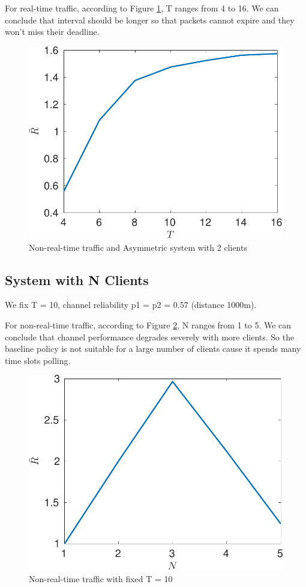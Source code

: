 \documentclass{article}
\begin{document}
For real-time traffic, according to Figure \ref{realtime_throughput_T}, T ranges from 4 to 16. We can conclude that interval should be longer so that packets cannot expire and they won't miss their deadline. 

\begin{figure}[htbp]
\centering
\includegraphics[scale=0.7]{realtime_throughput_T.pdf}
\caption{Non-real-time traffic and Asymmetric system with 2 clients}
\label{realtime_throughput_T}
\end{figure}

\subsection{System with N Clients}
We fix T = 10, channel reliability p1 = p2 = 0.57 (distance 1000m).

For non-real-time traffic, according to Figure \ref{nonrealtime_throughput_N}, N ranges from 1 to 5. We can conclude that channel performance degrades severely with more clients. So the baseline policy is not suitable for a large number of clients cause it spends many time slots polling. 

\begin{figure}[htbp]
\centering
\includegraphics[scale=0.7]{nonrealtime_throughput_N.pdf}
\caption{Non-real-time traffic with fixed T = 10}
\label{nonrealtime_throughput_N}
\end{figure}
\end{document}
